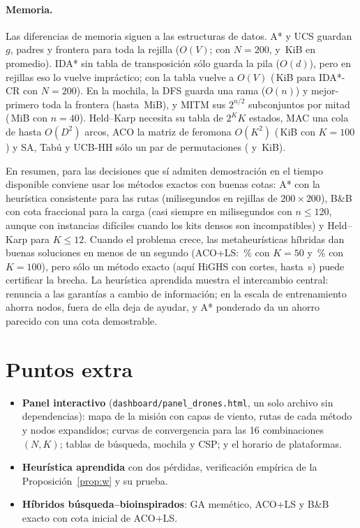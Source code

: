\documentclass[11pt]{article}
\theoremstyle{remark}
\begin{document}
\paragraph{Memoria.} Las diferencias de memoria siguen a las estructuras de datos. A* y UCS guardan
$g$, padres y frontera para toda la rejilla ($O(V)$; con $N=200$, \memAstarNCAA{} y \memUcsNCAA\,KiB en
promedio). IDA* sin tabla de transposición sólo guarda la pila ($O(d)$), pero en rejillas eso lo
vuelve impráctico; con la tabla vuelve a $O(V)$ (\memIdaCrNCAA\,KiB para IDA*-CR con $N=200$). En la
mochila, la DFS guarda una rama ($O(n)$) y mejor-primero toda la frontera (hasta \bnbBestMemMax\,MiB),
y MITM sus $2^{n/2}$ subconjuntos por mitad (\mitmMem\,MiB con $n=40$). Held--Karp necesita su tabla de
$2^K K$ estados, MAC una cola de hasta $O(D^2)$ arcos, ACO la matriz de feromona $O(K^2)$
(\memMetaAco\,KiB con $K=100$) y SA, Tabú y UCB-HH sólo un par de permutaciones (\memMetaSa{} y
\memMetaTabu\,KiB).

En resumen, para las decisiones que sí admiten demostración en el tiempo disponible conviene usar
los métodos exactos con buenas cotas: A* con la heurística consistente para las rutas (milisegundos en
rejillas de $200\times200$), B\&B con cota fraccional para la carga (casi siempre en milisegundos con
$n\le120$, aunque con instancias difíciles cuando los kits densos son incompatibles) y Held--Karp para
$K\le12$. Cuando el problema crece, las metaheurísticas híbridas dan buenas soluciones en menos de un
segundo (ACO+LS: \mejorGapKFA\,\% con $K=50$ y \mejorGapKBAA\,\% con $K=100$), pero sólo un método
exacto (aquí HiGHS con cortes, hasta \milpMaxT\,s) puede certificar la brecha. La heurística aprendida
muestra el intercambio central: renuncia a las garantías a cambio de información; en la escala de
entrenamiento ahorra nodos, fuera de ella deja de ayudar, y A* ponderado da un ahorro parecido con una
cota demostrable.

\section{Puntos extra}
\begin{itemize}
\item \textbf{Panel interactivo} (\texttt{dashboard/panel\_drones.html}, un solo archivo sin
dependencias): mapa de la misión con capas de viento, rutas de cada método y nodos expandidos;
curvas de convergencia para las 16 combinaciones $(N,K)$; tablas de búsqueda, mochila y CSP; y el
horario de plataformas.
\item \textbf{Heurística aprendida} con dos pérdidas, verificación empírica de la
Proposición~\ref{prop:w} y su prueba.
\item \textbf{Híbridos búsqueda--bioinspirados}: GA memético, ACO+LS y B\&B exacto con cota inicial
de ACO+LS.
\end{itemize}
\end{document}
